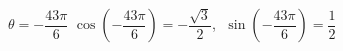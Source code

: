 {$\theta = -\dfrac{43\pi}{6}$}
{$\cos\left(-\dfrac{43\pi}{6}\right) = -\dfrac{\sqrt{3}}{2}$, $\; \sin\left(-\dfrac{43\pi}{6}\right) = \dfrac{1}{2}$}
